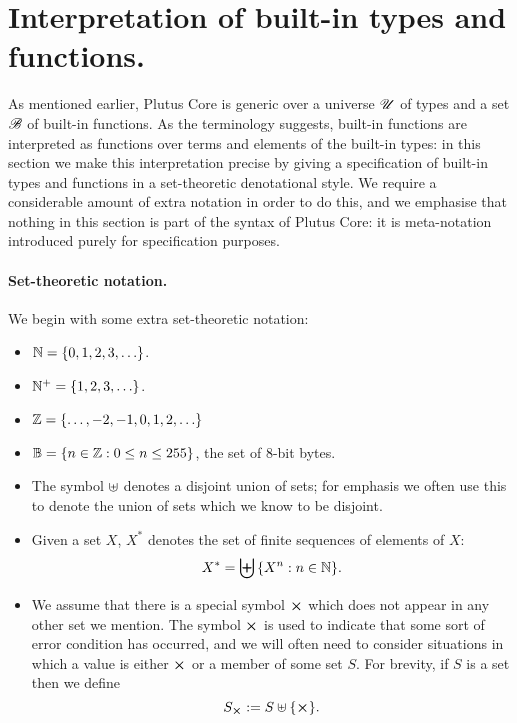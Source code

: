 \section{Interpretation of built-in types and functions.}
\label{sec:specify-builtins}
As mentioned earlier, Plutus Core is generic over a universe $\mathscr{U}$ of types and
a set $\mathscr{B}$ of built-in functions.  As the terminology suggests, built-in
functions are interpreted as functions over terms and elements of the built-in
types: in this section we make this interpretation precise by giving a
specification of built-in types and functions in a set-theoretic denotational
style.  We require a considerable amount of extra notation in order to do this,
and we emphasise that nothing in this section is part of the syntax of Plutus
Core: it is meta-notation introduced purely for specification purposes.


\paragraph{Set-theoretic notation.}
We begin with some extra set-theoretic notation:
\begin{itemize}
  \item $\mathbb{N} = \{0,1,2,3,\ldots\}$.
  \item $\mathbb{N}^{+} = \{1,2,3,\ldots\}$.
  \item $\mathbb{Z} = \{\ldots, -2, -1, 0, 1, 2, \ldots\}$
  \item $\mathbb{B} = \{n \in \mathbb{Z}: 0 \leq n \leq 255\}$, the set of 8-bit bytes.
\item The symbol $\uplus$ denotes a disjoint union of sets;  for emphasis we often use this
  to denote the union of sets which we know to be disjoint.
\item Given a set $X$, $X^*$ denotes the set of finite sequences of elements of
  $X$:
$$
  X^*= \biguplus{\{X^n: n \in \mathbb{N}\}}.
  $$
\item We assume that there is a special symbol $\errorX$ which does not appear
  in any other set we mention.  The symbol $\errorX$ is used to indicate that
  some sort of error condition has occurred, and we will often need to consider
  situations in which a value is either $\errorX$ or a member of some set $S$.
  For brevity, if $S$ is a set then we define
      $$
      \withError{S} := S \disj \{\errorX\}.
      $$
\end{itemize}

